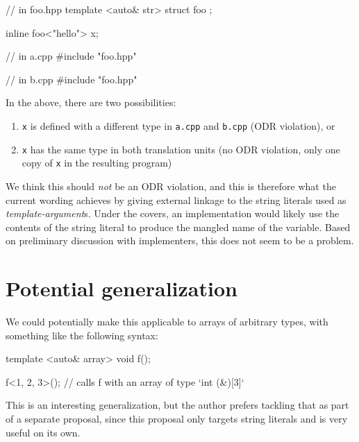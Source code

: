 \documentclass{wg21}
\newcommand{\cc}[1]{\texttt{#1}}
\begin{document}
\begin{cpp}
// in foo.hpp
template <auto& str>
struct foo { };

inline foo<"hello"> x;

// in a.cpp
#include "foo.hpp"

// in b.cpp
#include "foo.hpp"
\end{cpp}

In the above, there are two possibilities:
\begin{enumerate}
  \item \cc{x} is defined with a different type in \cc{a.cpp} and \cc{b.cpp}
        (ODR violation), or
  \item \cc{x} has the same type in both translation units (no ODR violation,
        only one copy of \cc{x} in the resulting program)
\end{enumerate}

We think this should \textit{not} be an ODR violation, and this is therefore
what the current wording achieves by giving external linkage to the string
literals used as \textit{template-argument}s. Under the covers, an
implementation would likely use the contents of the string literal to
produce the mangled name of the variable. Based on preliminary discussion
with implementers, this does not seem to be a problem.


\section{Potential generalization}
We could potentially make this applicable to arrays of arbitrary types,
with something like the following syntax:

\begin{cpp}
template <auto& array> void f();

f<{1, 2, 3}>(); // calls f with an array of type `int (&)[3]`
\end{cpp}

This is an interesting generalization, but the author prefers tackling
that as part of a separate proposal, since this proposal only targets
string literals and is very useful on its own.
\end{document}
